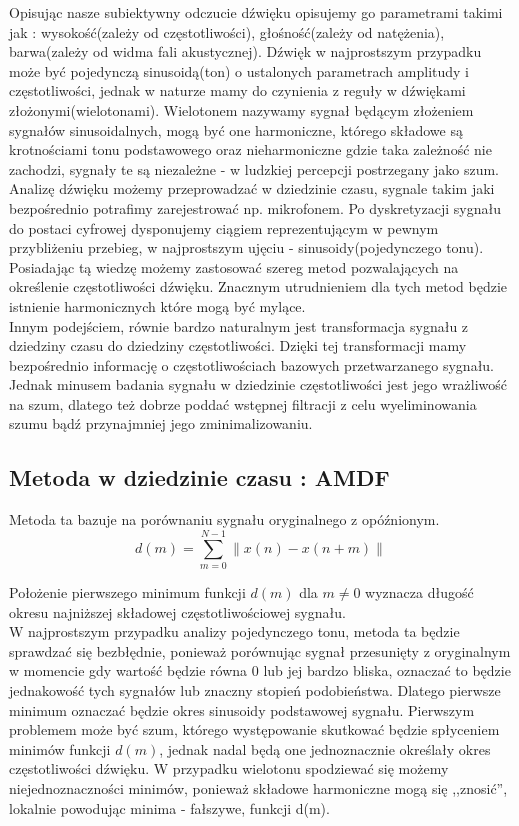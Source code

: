 \documentclass{classrep}
\begin{document}
Opisując nasze subiektywny odczucie dźwięku opisujemy go parametrami takimi jak : wysokość(zależy od częstotliwości), głośność(zależy od natężenia), barwa(zależy od widma fali akustycznej). Dźwięk w najprostszym przypadku może być pojedynczą sinusoidą(ton) o ustalonych parametrach amplitudy i częstotliwości, jednak w naturze mamy do czynienia z reguły w dźwiękami złożonymi(wielotonami). Wielotonem nazywamy sygnał będącym złożeniem sygnałów sinusoidalnych, mogą być one harmoniczne, którego składowe są krotnościami tonu podstawowego oraz nieharmoniczne gdzie taka zależność nie zachodzi, sygnały te są niezależne - w ludzkiej percepcji postrzegany jako szum.\\
\indent Analizę dźwięku możemy przeprowadzać w dziedzinie czasu, sygnale takim jaki bezpośrednio potrafimy zarejestrować np. mikrofonem. Po dyskretyzacji sygnału do postaci cyfrowej dysponujemy ciągiem reprezentującym w pewnym przybliżeniu przebieg, w najprostszym ujęciu - sinusoidy(pojedynczego tonu). Posiadając tą wiedzę możemy zastosować szereg metod pozwalających na określenie częstotliwości dźwięku. Znacznym utrudnieniem dla tych metod będzie istnienie harmonicznych które mogą być mylące.\\
\indent Innym podejściem, równie bardzo naturalnym jest transformacja sygnału z dziedziny czasu do dziedziny częstotliwości. Dzięki tej transformacji mamy bezpośrednio informację o częstotliwościach bazowych przetwarzanego sygnału. Jednak minusem badania sygnału w dziedzinie częstotliwości jest jego wrażliwość na szum, dlatego też dobrze poddać wstępnej filtracji z celu wyeliminowania szumu bądź przynajmniej jego zminimalizowaniu.


\subsection{Metoda w dziedzinie czasu : AMDF}


Metoda ta bazuje na porównaniu sygnału oryginalnego z opóźnionym. 
\begin{equation}
d(m) = \sum \limits ^{N-1} _{m=0} \| x(n) - x(n+m) \|
\end{equation}

Położenie pierwszego minimum funkcji $d(m)$ dla $m \neq 0$ wyznacza długość okresu najniższej składowej częstotliwościowej sygnału.\\
\indent W najprostszym przypadku analizy pojedynczego tonu, metoda ta będzie sprawdzać się bezbłędnie, ponieważ porównując sygnał przesunięty z oryginalnym w momencie gdy wartość będzie równa 0 lub jej bardzo bliska, oznaczać to będzie jednakowość tych sygnałów lub znaczny stopień podobieństwa. Dlatego pierwsze minimum oznaczać będzie okres sinusoidy podstawowej sygnału. Pierwszym problemem może być szum, którego występowanie skutkować będzie spłyceniem minimów funkcji $d(m)$, jednak nadal będą one jednoznacznie określały okres częstotliwości dźwięku. W przypadku wielotonu spodziewać się możemy niejednoznaczności minimów, ponieważ składowe harmoniczne mogą się ,,znosić'', lokalnie powodując minima - fałszywe, funkcji d(m).
\end{document}
